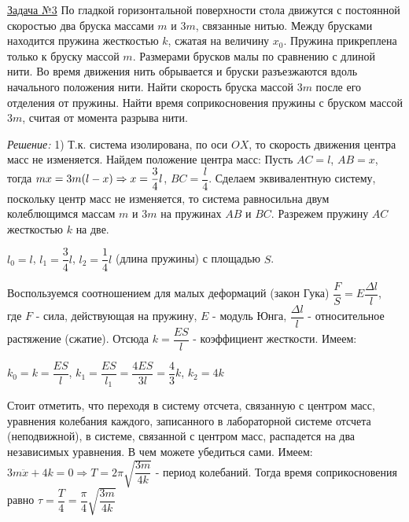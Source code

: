 \documentclass[a4paper,12pt]{article} %
\begin{document}
\underline{Задача №3} По гладкой горизонтальной поверхности стола движутся с постоянной
скоростью два бруска массами $m$ и $3m$, связанные нитью. Между брусками находится пружина
жесткостью $k$, сжатая на величину $x_0$. Пружина прикреплена только к бруску
массой $m$. Размерами брусков малы по сравнению с длиной нити. Во время движения
нить обрывается и бруски разъезжаются вдоль начального положения нити. Найти
скорость бруска массой $3m$ после его отделения от пружины. Найти время соприкосновения
пружины с бруском массой $3m$, считая от момента разрыва нити.
\begin{wrapfigure}{r}{0.6\textwidth}
	\centering
	\vspace{-3ex}
	
	
	\vspace{-4ex}
\end{wrapfigure}
\textit{Решение:} 1) Т.к. система изолирована, по оси $OX$, то скорость движения 
центра масс не изменяется. Найдем положение центра масс: Пусть $AC=l$, $AB=x$, тогда 
$mx=3m(l-x) \Rightarrow \\ x=\dfrac34 l$, $BC=\dfrac{l}4$. Сделаем эквивалентную систему,
поскольку центр масс не изменяется, то система равносильна двум колеблющимся массам
$m$ и $3m$ на пружинах $AB$ и $BC$. Разрежем пружину $AC$ жесткостью $k$ на две.
\begin{center}
$l_0=l$, $l_1=\dfrac34 l$, $l_2=\dfrac14 l$ (длина пружины) с площадью $S$.
\end{center}
\begin{wrapfigure}{l!}{0.45\textwidth}
	\vspace{-3ex}
	
	\vspace{-17ex}
\end{wrapfigure}
Воспользуемся соотношением для малых деформаций (закон Гука) $\dfrac{F}{S}=E\dfrac{\Delta l}{l}$, \\
где $F$ - сила, действующая на пружину, $E$ - модуль Юнга, $\dfrac{\Delta l}{l}$ - относительное растяжение (сжатие).
Отсюда $k=\dfrac{ES}{l}$ - коэффициент жесткости. Имеем:
\begin{center}
	$k_0=k=\dfrac{ES}{l}$, $k_1=\dfrac{ES}{l_1} = \dfrac{4ES}{3l} =\dfrac43 k$, $k_2=4k$
\end{center}
Стоит отметить, что переходя в систему отсчета, связанную с центром масс, уравнения
колебания каждого, записанного в лабораторной системе отсчета (неподвижной), в системе, 
связанной с центром масс, распадется на два независимых уравнения. В чем можете убедиться сами.
Имеем: $3m \ddot x+4k=0 \Rightarrow T=2\pi\sqrt{\dfrac{3m}{4k}}$ - период колебаний.
Тогда время соприкосновения равно $\tau = \dfrac{T}4=\dfrac{\pi}4 \sqrt{\dfrac{3m}{4k}}$
\end{document}
